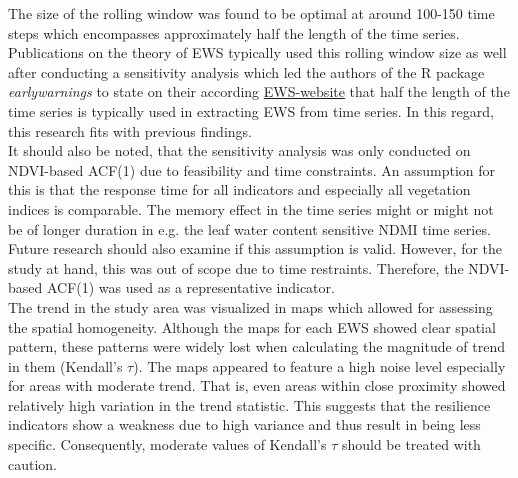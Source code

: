 The size of the rolling window was found to be optimal at around 100-150 time steps which encompasses approximately half the length of the time series. Publications on the theory of EWS typically used this rolling window size as well after conducting a sensitivity analysis \citep{dakos2008, dakos2012} which led the authors of the R package \textit{earlywarnings} \citep{earlywarnr} to state on their according \href{http://www.early-warning-signals.org/time-series-methods/metric-based-indicators/general-steps-for-rolling-window-metrics/}{EWS-website} that half the length of the time series is typically used in extracting EWS from time series. In this regard, this research fits with previous findings.\\
It should also be noted, that the sensitivity analysis was only conducted on NDVI-based ACF(1) due to feasibility and time constraints. An assumption for this is that the response time for all indicators and especially all vegetation indices is comparable. The memory effect in the time series might or might not be of longer duration in e.g. the leaf water content sensitive NDMI time series. Future research should also examine if this assumption is valid. However, for the study at hand, this was out of scope due to time restraints. Therefore, the NDVI-based ACF(1) was used as a representative indicator.\\
The trend in the study area was visualized in maps which allowed for assessing the spatial homogeneity. Although the maps for each EWS showed clear spatial pattern, these patterns were widely lost when calculating the magnitude of trend in them (Kendall's $\tau$). The maps appeared to feature a high noise level especially for areas with moderate trend. That is, even areas within close proximity showed relatively high variation in the trend statistic. This suggests that the resilience indicators show a weakness due to high variance and thus result in being less specific. Consequently, moderate values of Kendall's $\tau$ should be treated with caution.\\



